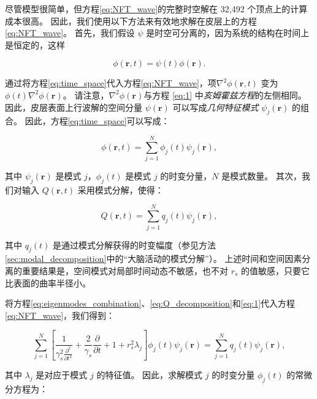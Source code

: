 \documentclass[lang=cn,a4paper,newtx,citestyle=gb7714-2015, bibstyle=gb7714-2015]{elegantpaper}
\begin{document}
尽管模型很简单，但方程\ref{eq:NFT_wave}的完整时空解在 32,492 个顶点上的计算成本很高。
因此，我们使用以下方法来有效地求解在皮层上的方程\ref{eq:NFT_wave}。
首先，我们假设 $ \psi $ 是时空可分离的，因为系统的结构在时间上是恒定的，这样

\begin{equation}\label{eq:time_space}
	\phi(\boldsymbol{r}, t) = 
		\psi(t) \phi(\boldsymbol{r}).
\end{equation}

通过将方程\ref{eq:time_space}代入方程\ref{eq:NFT_wave}，项$ \nabla^2 \phi(\boldsymbol{r}, t) $ 变为 $ \phi(t) \nabla^2 \phi
(\boldsymbol{r}) $。
请注意，$ \nabla^2 \phi(\boldsymbol{r}) $与方程 \ref{eq:1} 中\textit{亥姆霍兹方程}的左侧相同。
因此，皮层表面上行波解的空间分量 $ \psi(\boldsymbol{r}) $ 可以写成\textit{几何特征模式} $ \psi_j(\boldsymbol{r}) $ 的组合。
因此，方程\ref{eq:time_space}可以写成：

\begin{equation}\label{eq:eigenmodes_combination}
	\phi(\boldsymbol{r}, t) = 
		\sum_{j=1}^{N}
			\phi_j(t) \psi_j(\boldsymbol{r}),
\end{equation}

其中 $ \psi_j(\boldsymbol{r}) $ 是模式 $ j $，$ \phi_j(t) $ 是模式 $ j $ 的时变分量，$ N $ 是模式数量。
其次，我们对输入 $ Q(\boldsymbol{r},t) $ 采用模式分解，使得：

\begin{equation}\label{eq:Q_decomposition}
	Q(\boldsymbol{r}, t) = 
		\sum_{j=1}^{N}
			q_j(t) \psi_j(\boldsymbol{r}),
\end{equation}


其中 $ q_j (t) $ 是通过模式分解获得的时变幅度（参见方法\ref{sec:modal_decomposition}中的“大脑活动的模式分解”）。
上述时间和空间因素分离的重要结果是，空间模式对局部时间动态不敏感，也不对 $ r_s $ 的值敏感，只要它比表面的曲率半径小。


将方程\ref{eq:eigenmodes_combination}、\ref{eq:Q_decomposition}和\ref{eq:1}代入方程\ref{eq:NFT_wave}，我们得到：

\begin{equation}\label{eq:NFT_expand}
	\sum_{j=1}^{N}
		[
		\frac{1}{\gamma _s^2 \frac{\partial^2}{\partial t^2}} +
		\frac{2}{\gamma _s} \frac{\partial}{\partial t} +
		1 + r_s^2 \lambda_j
		]
		\phi_j(t)
		\psi_j(\boldsymbol{r})
	=
		\sum_{j=1}^{N}
			q_j(t)
			\psi_j(\boldsymbol{r}),
\end{equation}

其中 $ λ_j $ 是对应于模式 $ j $ 的特征值。
因此，求解模式 $ j $ 的时变分量 $ \phi_j (t) $ 的常微分方程为：
\end{document}
